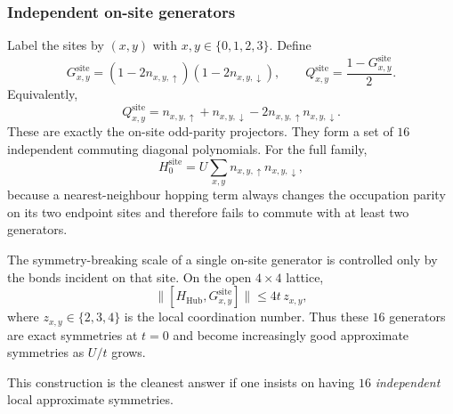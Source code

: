 \documentclass[11pt]{article}
\theoremstyle{definition}
\theoremstyle{remark}
\begin{document}
\subsubsection{Independent on-site generators}
Label the sites by $(x,y)$ with $x,y\in\{0,1,2,3\}$. Define
\begin{equation}
  G_{x,y}^{\mathrm{site}}
  =(1-2n_{x,y,\uparrow})(1-2n_{x,y,\downarrow}),
  \qquad
  Q_{x,y}^{\mathrm{site}}=\frac{1-G_{x,y}^{\mathrm{site}}}{2}.
\end{equation}
Equivalently,
\begin{equation}
  Q_{x,y}^{\mathrm{site}}
  =n_{x,y,\uparrow}+n_{x,y,\downarrow}-2n_{x,y,\uparrow}n_{x,y,\downarrow}.
\end{equation}
These are exactly the on-site odd-parity projectors. They form a set of $16$ independent commuting diagonal polynomials. For the full family,
\begin{equation}
  H_0^{\mathrm{site}}=U\sum_{x,y}n_{x,y,\uparrow}n_{x,y,\downarrow},
\end{equation}
because a nearest-neighbour hopping term always changes the occupation parity on its two endpoint sites and therefore fails to commute with at least two generators.

The symmetry-breaking scale of a single on-site generator is controlled only by the bonds incident on that site. On the open $4\times 4$ lattice,
\begin{equation}
  \|[H_{\mathrm{Hub}},G_{x,y}^{\mathrm{site}}]\|
  \le 4t\,z_{x,y},
\end{equation}
where $z_{x,y}\in\{2,3,4\}$ is the local coordination number. Thus these $16$ generators are exact symmetries at $t=0$ and become increasingly good approximate symmetries as $U/t$ grows.

This construction is the cleanest answer if one insists on having $16$ \emph{independent} local approximate symmetries.
\end{document}
